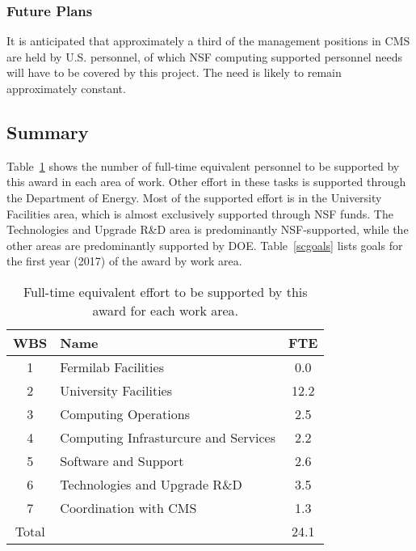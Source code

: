 \documentclass[11pt,a4paper]{article}
\begin{document}
\subsubsection{Future Plans}

It is anticipated that approximately a third of the management positions
in CMS are held by U.S. personnel, of which NSF computing supported 
personnel needs will have to be covered by this project.  The need
is likely to remain approximately constant.

\subsection{Summary}
\label{summary}

Table~\ref{scftecount} shows the number of full-time equivalent
personnel to be supported by this award in each area of work.  Other effort
in these tasks is supported through the Department of Energy.  Most of the
supported effort is in the University Facilities area, which is almost
exclusively supported through NSF funds.  The Technologies and Upgrade R\&D
area is predominantly NSF-supported, while the other areas are
predominantly supported by DOE.  Table~\ref{scgoals} lists goals for the first year (2017) of the award
by work area.  

\begin{table}
\begin{center}
\begin{tabular}{|c|l|c|}
\hline
WBS & Name & FTE \\\hline
1 & Fermilab Facilities & 0.0\\
2 & University Facilities & 12.2\\
3 & Computing Operations & 2.5\\
4 & Computing Infrasturcure and Services & 2.2\\
5 & Software and Support & 2.6\\
6 & Technologies and Upgrade R\&D & 3.5\\
7 & Coordination with CMS & 1.3\\\hline
Total & & 24.1 \\\hline
\end{tabular}
\caption[]
{
Full-time equivalent effort to be supported by this award for each work area.
}
\label{scftecount}
\end{center}
\end{table}
\end{document}
